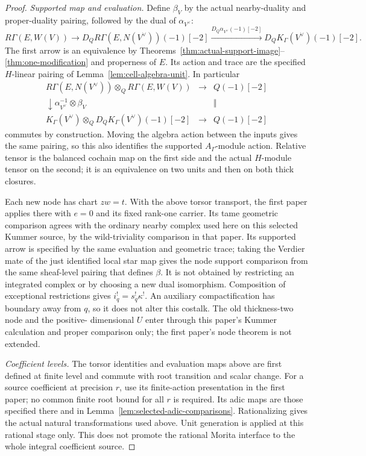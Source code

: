 \documentclass[11pt]{article}
\theoremstyle{definition}
\theoremstyle{remark}
\begin{document}
\begin{proof}
\emph{Supported map and evaluation.}
Define $\beta_V$ by the actual nearby-duality and proper-duality
pairing, followed by the dual of $\alpha_{V^\vee}$:
\[
 R\Gamma(E,W(V))\longrightarrow
 D_QR\Gamma(E,N(V^\vee))(-1)[-2]
 \xrightarrow{D_Q\alpha_{V^\vee}(-1)[-2]}
 D_QK_\Gamma(V^\vee)(-1)[-2].
\]
The first arrow is an equivalence by
Theorems~\ref{thm:actual-support-image}--\ref{thm:one-modification}
and properness of $E$.  Its action and trace are the specified
$H$-linear pairing of Lemma~\ref{lem:cell-algebra-unit}.  In particular
\[
\begin{array}{ccc}
 R\Gamma(E,N(V^\vee))\otimes_Q R\Gamma(E,W(V))
     &\longrightarrow&Q(-1)[-2]\\
 \downarrow\scriptstyle{\alpha_{V^\vee}^{-1}\otimes\beta_V}
     &&\Vert\\
 K_\Gamma(V^\vee)\otimes_QD_QK_\Gamma(V^\vee)(-1)[-2]
     &\longrightarrow&Q(-1)[-2]
\end{array}
\]
commutes by construction.  Moving the algebra action between the
inputs gives the same pairing, so this also identifies the supported
$A_\Gamma$-module action.  Relative tensor is the balanced cochain map
on the first side and the actual $H$-module tensor on the second;
it is an equivalence on two units and then on both thick closures.

Each new node has chart $zw=t$.  With the above torsor transport,
the first paper applies there with $e=0$ and its fixed rank-one
carrier.  Its tame geometric comparison agrees with the ordinary
nearby complex used here on this selected Kummer source, by the
wild-triviality comparison in that paper.  Its supported arrow is
specified by the same evaluation and geometric trace; taking the
Verdier mate of the just identified local star map gives the node
support comparison from the same sheaf-level pairing that defines
$\beta$.  It is not obtained by restricting an integrated complex
or by choosing a new dual isomorphism.
Composition of exceptional restrictions gives $i_q^!=s_q^!\kappa^!$.
An auxiliary compactification has boundary away from $q$, so it does
not alter this costalk.  The old thickness-two node and the positive-
dimensional $U$ enter through this paper's Kummer calculation and
proper comparison only; the first paper's node theorem is not extended.

\emph{Coefficient levels.}
The torsor identities and evaluation maps above are first defined
at finite level and commute with root transition and scalar change.
For a source coefficient at precision $r$, use its finite-action
presentation in the first paper; no common finite root bound for
all $r$ is required.  Its adic maps are those specified there and
in Lemma~\ref{lem:selected-adic-comparisons}.  Rationalizing gives
the actual natural transformations used above.  Unit generation is
applied at this rational stage only.  This does not promote the
rational Morita interface to the whole integral coefficient source.
\end{proof}
\end{document}
